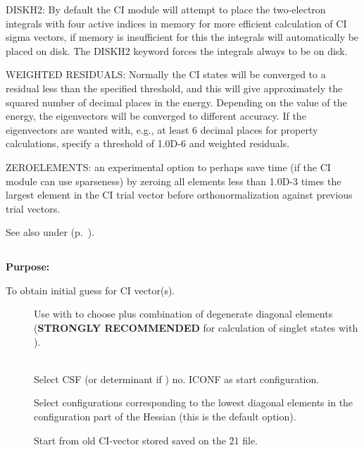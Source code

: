  
 
DISKH2: By default the CI module will attempt to place the two-electron
integrals with four active indices in memory for more efficient
calculation of CI sigma vectors, if memory is insufficient for this
the 
integrals will automatically be placed on disk.  The DISKH2 keyword
forces the integrals always to be on disk.
 
WEIGHTED RESIDUALS:  Normally the CI states will be converged to a
residual less than the specified threshold, and this will give
approximately the squared number of decimal places in the energy.
Depending on the value of the energy, the eigenvectors will be converged
to different accuracy. If the eigenvectors are wanted with, e.g., at
least 6 decimal places for property calculations, specify a threshold of
1.0D-6 and weighted residuals.
 
ZEROELEMENTS: an experimental option to perhaps save time (if the CI
module can use sparseness) by zeroing all elements less than 1.0D-3
times the largest element in the CI trial vector before
orthonormalization against previous trial vectors.
 
See also  under 
(p.~\pageref{ref-optinp}).
 
 
\pagebreak[3]
\subsection{\label{ref-civinp}}
 
{\bf Purpose:}
 
To obtain initial guess for CI vector(s).
 
\begin{description}
\item[]
  Use with  to choose plus combination
  of degenerate   diagonal elements ({\bf STRONGLY RECOMMENDED} for
  calculation of singlet states  with ).

\item[]
   \\
  Select CSF (or determinant if ) no.
  ICONF as start configuration.
 
\item[]
  Select configurations corresponding to the lowest diagonal elements in
  the configuration part of the Hessian (this is the default option).
 
\item[]
  Start from old CI-vector stored saved on the \f{21} file.

 
\end{description}
 
